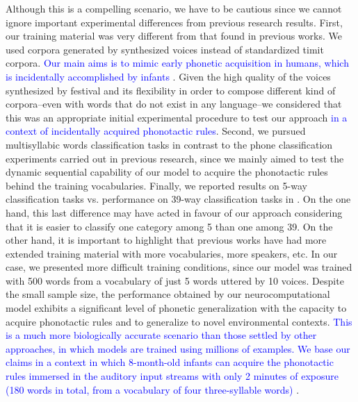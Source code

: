\documentclass[10pt,letterpaper]{article}
\begin{document}
Although this is a compelling scenario, we have to be cautious since we cannot ignore important experimental differences from previous research results. First, our training material was very different from that found in previous works. We used corpora generated by synthesized voices instead of standardized \gls{timit} corpora.
\textcolor{blue}{Our main aims is to mimic early phonetic acquisition in humans, which is incidentally accomplished by infants \cite{Saffran1996StatisticalLB}}.
Given the high quality of the voices synthesized by \gls{festival} \cite{festival2014} and its flexibility in order to compose different kind of corpora--even with words that do not exist in any language--we considered that this was an appropriate initial experimental procedure to test our approach \textcolor{blue}{in a context of incidentally acquired phonotactic rules}. 
Second, we pursued multisyllabic words classification tasks in contrast to the phone classification experiments carried out in previous research,
since we mainly aimed to test the dynamic sequential capability of our model to acquire the phonotactic rules behind the training vocabularies. 
Finally, we reported results on 5-way classification tasks vs. performance on 39-way classification tasks in \cite{Lee:2009:UFL:2984093.2984217}. 
On the one hand, this last difference may have acted in favour of our approach considering that it is easier to classify one category among 5 than one among 39.
On the other hand, it is important to highlight that previous works have had more extended training material with more vocabularies, more speakers, etc.
In our case, we presented more difficult training conditions, since our model was trained with 500 words from a vocabulary of just 5 words uttered by 10 voices.
Despite the small sample size, the performance obtained by our neurocomputational model exhibits a significant level of phonetic generalization with the capacity to acquire phonotactic rules and to generalize to novel environmental contexts. \textcolor{blue}{This is a much more biologically accurate scenario than those settled by other approaches, in which models are trained using millions of examples. We base our claims in a context in which 8-month-old infants can acquire the phonotactic rules immersed in the auditory input streams with only 2 minutes of exposure (180 words in total, from a vocabulary of four three-syllable words) \cite{Saffran1996StatisticalLB}}.
\end{document}
